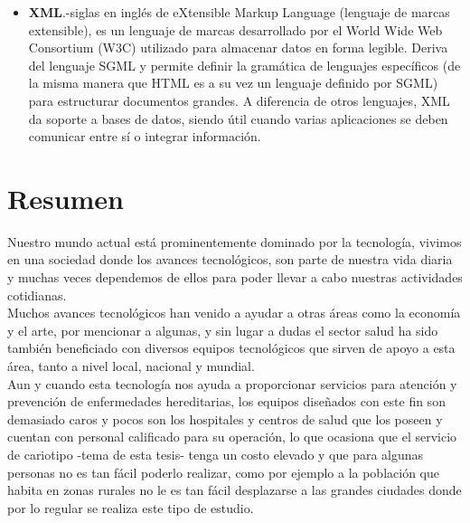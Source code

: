\documentclass[12pt,letterpaper,titlepage]{article}
\begin{document}
\begin{itemize}
\item \textbf{XML}.-siglas en inglés de eXtensible Markup Language (lenguaje de marcas extensible), es un lenguaje de marcas desarrollado por el World Wide Web Consortium (W3C) utilizado para almacenar datos en forma legible. Deriva del lenguaje SGML y permite definir la gramática de lenguajes específicos (de la misma manera que HTML es a su vez un lenguaje definido por SGML) para estructurar documentos grandes. A diferencia de otros lenguajes, XML da soporte a bases de datos, siendo útil cuando varias aplicaciones se deben comunicar entre sí o integrar información.\\

\end{itemize}


\newpage
{}
\section{Resumen}\label{resumen}
Nuestro mundo actual está prominentemente dominado por la tecnología, vivimos en una sociedad donde los avances tecnológicos, son parte de nuestra vida diaria y muchas veces dependemos de ellos para poder llevar a cabo nuestras actividades cotidianas.\\

Muchos avances tecnológicos han venido a ayudar a otras áreas como la economía y el arte, por mencionar a algunas, y sin lugar a dudas el sector salud ha sido también beneficiado con diversos equipos tecnológicos que sirven de apoyo a esta área, tanto a nivel local, nacional y mundial.\\

Aun y cuando esta tecnología nos ayuda a proporcionar servicios para atención y prevención de enfermedades hereditarias, los equipos diseñados con este fin son demasiado caros y pocos son los hospitales y centros de salud que los poseen y cuentan con personal calificado para su operación, lo que ocasiona que el servicio de cariotipo -tema de esta tesis- tenga un costo elevado y que para algunas personas no es tan fácil poderlo realizar, como por ejemplo a la población que habita en zonas rurales no le es tan fácil desplazarse a las grandes ciudades donde por lo regular se realiza este tipo de estudio.\\
\end{document}
